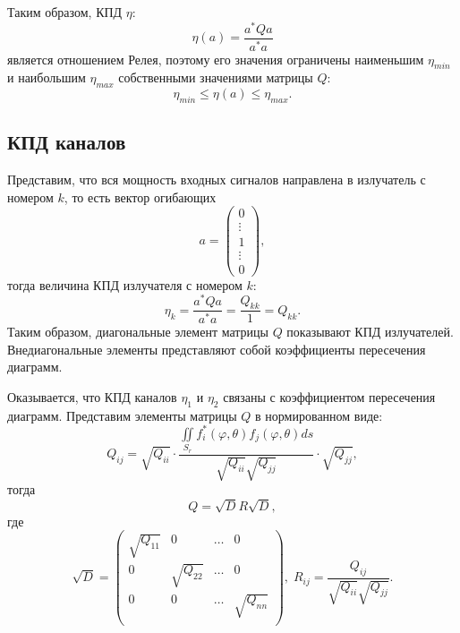 Таким образом, КПД $\eta$:
\[
    \eta(a) = \frac{a^* Q a}{a^* a}
\]
является отношением Релея, поэтому его значения ограничены наименьшим $\eta_{min}$ и наибольшим $\eta_{max}$ собственными значениями матрицы $Q$:
\[
    \eta_{min} \le \eta(a) \le \eta_{max} .
\]

\subsection{КПД каналов}

Представим, что вся мощность входных сигналов направлена в излучатель с номером $k$, то есть вектор огибающих
\[
    a
    = \begin{pmatrix}
        0      \\
        \vdots \\
        1      \\
        \vdots \\
        0
    \end{pmatrix} ,
\]
тогда величина КПД излучателя с номером $k$:
\[
    \eta_k
    = \frac{a^* Q a}{a^* a}
    = \frac{Q_{kk}}{1}
    = Q_{kk} .
\]
Таким образом, диагональные элемент матрицы $Q$ показывают КПД излучателей. Внедиагональные элементы представляют собой коэффициенты пересечения диаграмм.

Оказывается, что КПД каналов $\eta_1$ и $\eta_2$ связаны с коэффициентом пересечения диаграмм. Представим элементы матрицы $Q$ в нормированном виде:
\[
    Q_{ij}
    =
    \sqrt{Q_{ii}}
    \cdot
    \frac{\iint \limits_{S_r} f_i^*(\varphi, \theta) f_j(\varphi, \theta) ds}{\sqrt{Q_{ii}} \sqrt{Q_{jj}}}
    \cdot
    \sqrt{Q_{jj}} ,
\]
тогда
\[
    Q = \sqrt{D} R \sqrt{D} ,
\]
где
\[
    \sqrt{D}
    = \begin{pmatrix}
        \sqrt{Q_{11}} & 0             & \dots & 0             \\
        0             & \sqrt{Q_{22}} & \dots & 0             \\
        0             & 0             & \dots & \sqrt{Q_{nn}} \\
    \end{pmatrix} ,
    \;
    R_{ij} = \frac{Q_{ij}}{\sqrt{Q_{ii}} \sqrt{Q_{jj}}} .
\]

